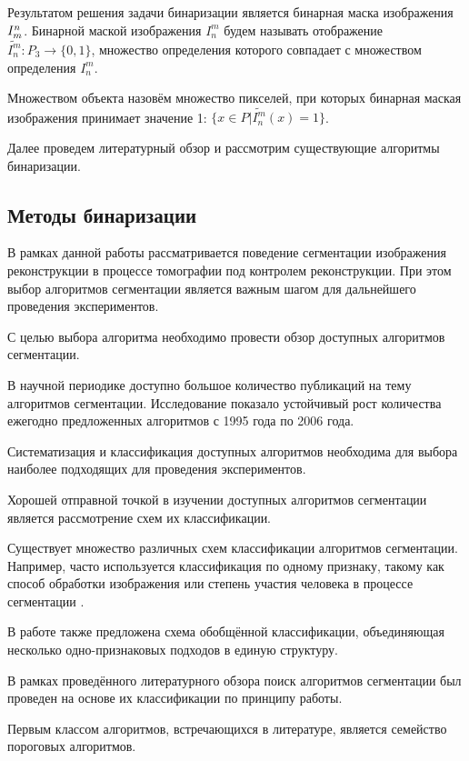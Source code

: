 Результатом решения задачи бинаризации является бинарная маска изображения \(I^n_m\).
Бинарной маской изображения \(I_n^m\) будем называть отображение \(\tilde{I_n^m} : P_3 \rightarrow \{0, 1\}\), множество определения которого совпадает с множеством определения \(I_n^m\).

Множеством объекта назовём множество пикселей, при которых бинарная маская изображения принимает значение 1: \(\{x \in P | \tilde{I_n^m}(x) = 1 \}\).

Далее проведем литературный обзор и рассмотрим существующие алгоритмы бинаризации.



\subsection{Методы бинаризации}

В рамках данной работы рассматривается поведение сегментации изображения реконструкции в процессе томографии под контролем реконструкции. При этом выбор алгоритмов сегментации является важным шагом для дальнейшего проведения экспериментов.

С целью выбора алгоритма необходимо провести обзор доступных алгоритмов сегментации.

В научной периодике доступно большое количество публикаций на тему алгоритмов сегментации. Исследование \cite{zhang2006advances} показало устойчивый рост количества ежегодно предложенных алгоритмов с 1995 года по 2006 года.

Систематизация и классификация доступных алгоритмов необходима для выбора наиболее подходящих для проведения экспериментов. 

Хорошей отправной точкой в изучении доступных алгоритмов сегментации является рассмотрение схем их классификации. 

Существует множество различных схем классификации алгоритмов сегментации. Например, часто используется классификация по одному признаку, такому как способ обработки изображения или степень участия человека в процессе сегментации \cite{wirjadi2007survey}.

В работе \cite{ханыков2018классификация} также предложена схема обобщённой классификации, объединяющая несколько одно-признаковых подходов в единую структуру.

В рамках проведённого литературного обзора поиск алгоритмов сегментации был проведен на основе их классификации по принципу работы.

Первым классом алгоритмов, встречающихся в литературе, является семейство пороговых алгоритмов. 

